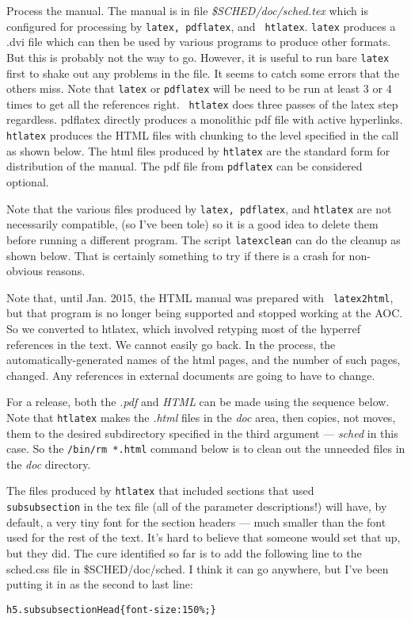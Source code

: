 \documentclass{report}
\begin{document}
\begin{description}
Process the manual.  The manual is in file {\sl \$SCHED/doc/sched.tex}
which is configured for processing by {\tt latex, pdflatex}, and {\tt
htlatex}.  {\tt latex} produces a .dvi file which can then be used by
various programs to produce other formats.  But this is probably not
the way to go.  However, it is useful to run bare {\tt latex} first
to shake out any problems in the file.  It seems to catch some errors that
the others miss.  Note that {\tt latex} or {\tt pdflatex} will be need
to be run at least 3 or 4 times to get all the references right.  {\tt
htlatex} does three passes of the latex step regardless.  pdflatex
directly produces a monolithic pdf file with active hyperlinks.  {\tt
htlatex} produces the HTML files with chunking to the level specified
in the call as shown below.  The html files produced by {\tt htlatex}
are the standard form for distribution of the manual.  The pdf file
from {\tt pdflatex} can be considered optional.

Note that the various files produced by {\tt latex, pdflatex}, and
{\tt htlatex} are not necessarily compatible, (so I've been tole) so
it is a good idea to delete them before running a different program.
The script {\tt latexclean} can do the cleanup as shown below.  That
is certainly something to try if there is a crash for non-obvious
reasons.

Note that, until Jan. 2015, the HTML manual was prepared with {\tt
latex2html}, but that program is no longer being supported and stopped
working at the AOC.  So we converted to htlatex, which involved
retyping most of the hyperref references in the text.  We cannot
easily go back.  In the process, the automatically-generated names of
the html pages, and the number of such pages, changed.  Any references
in external documents are going to have to change.

For a release, both the {\sl .pdf} and {\sl HTML} can be made using the 
sequence below.  Note that {\tt htlatex} makes the {\sl .html} files
in the {\sl doc} area, then copies, not moves, them to the desired
subdirectory specified in the third argument --- {\sl sched} in this
case.  So the {\tt /bin/rm *.html} command below is to clean out 
the unneeded files in the {\sl doc} directory.

The files produced by {\tt htlatex} that included sections that used
{\tt \\subsubsection} in the tex file (all of the parameter
descriptions!)  will have, by default, a very tiny font for the
section headers --- much smaller than the font used for the rest of
the text.  It's hard to believe that someone would set that up, but they
did.  The cure identified so far is to add the following line to the
sched.css file in \$SCHED/doc/sched.  I think it can go anywhere, but
I've been putting it in as the second to last line:
\begin{verbatim}
h5.subsubsectionHead{font-size:150%;}
\end{verbatim}


\end{description}
\end{document}
